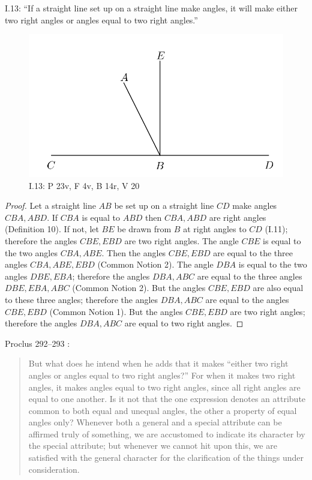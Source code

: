 \documentclass{article}
\begin{document}
I.13: ``If a straight line set up on a straight line make angles, it
will make either two right angles or angles equal to two right
angles.''

\begin{figure}
\begin{center}
\includegraphics[width=\textwidth]{I13.png}
\end{center}
\caption{I.13: P 23v, F 4v, B 14r, V 20}
\label{I13}
\end{figure}

\begin{proof}
Let a straight line $AB$ be set up on a straight line $CD$ make angles $CBA,ABD$.
If $CBA$ is equal to $ABD$ then $CBA,ABD$ are right angles (Definition 10).
If not, let $BE$ be drawn from $B$ at right angles to $CD$ (I.11); therefore
the angles $CBE, EBD$ are two right angles. 
The angle $CBE$ is equal to the two angles $CBA,ABE$.
Then the angles $CBE,EBD$ are equal to the three angles $CBA,ABE,EBD$ (Common Notion 2).
The angle $DBA$ is equal to the two angles $DBE,EBA$; therefore
the angles $DBA,ABC$ are equal to the three angles $DBE,EBA,ABC$ (Common Notion 2).
But the angles $CBE,EBD$ are also equal to these three angles; therefore the angles
$DBA,ABC$ are equal to the angles $CBE,EBD$ (Common Notion 1).
But the angles $CBE,EBD$ are two right angles; therefore
the angles $DBA,ABC$ are equal to two right angles.
\end{proof}

Proclus 292--293 \cite[pp.~228--229]{proclus}:

\begin{quote}
But what
does he intend when he adds that it makes ``either two right
angles or angles equal to two right angles?'' For when it
makes two right angles, it makes angles equal to two right
angles, since all right angles are equal to one another. Is it
not that the one expression denotes an attribute common to
both equal and unequal angles, the other a property of
equal angles only? Whenever both a general and a special
attribute can be affirmed truly of something, we are
accustomed to indicate its character by the special attribute;
but whenever we cannot hit upon this, we are satisfied with
the general character for the clarification of the things under consideration.
\end{quote}
\end{document}
